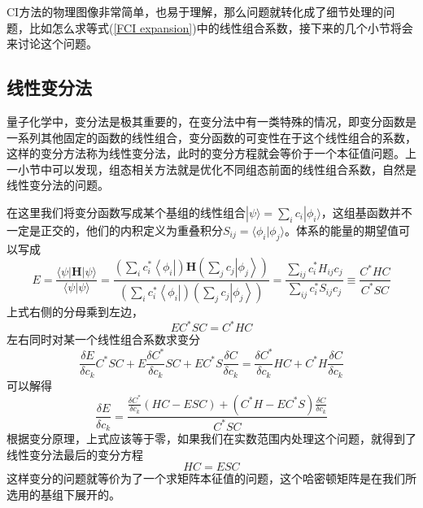 \documentclass[12pt,a4paper,openany,twoside]{book}
\numberwithin{equation}{section}
\begin{document}
          CI方法的物理图像非常简单，也易于理解，那么问题就转化成了细节处理的问题，比如怎么求等式(\ref{FCI expansion})中的线性组合系数，接下来的几个小节将会来讨论这个问题。
        \subsection{线性变分法}
          量子化学中，变分法是极其重要的，在变分法中有一类特殊的情况，即变分函数是一系列其他固定的函数的线性组合，变分函数的可变性在于这个线性组合的系数，这样的变分方法称为线性变分法，此时的变分方程就会等价于一个本征值问题。上一小节中可以发现，组态相关方法就是优化不同组态前面的线性组合系数，自然是线性变分法的问题。

          在这里我们将变分函数写成某个基组的线性组合$|\psi\rangle=\sum_{i} c_{i}|\phi_{i}\rangle$，这组基函数并不一定是正交的，他们的内积定义为重叠积分$S_{ij} = \langle \phi_i | \phi_j \rangle $。体系的能量的期望值可以写成
          \begin{equation}
            E=\frac{\langle\psi|\mathbf{H}| \psi\rangle}{\langle\psi | \psi\rangle}=\frac{(\sum_{i} c_{i}^{*}\left\langle\phi_{i}\right|) \mathbf{H}(\sum_{j} c_{j}\left|\phi_{j}\right\rangle)}{(\sum_{i} c_{i}^{*}\left\langle\phi_{i}\right|)(\sum_{j} c_{j}\left|\phi_{j}\right\rangle)}=\frac{\sum_{i j} c_{i}^{*} H_{i j} c_{j}}{\sum_{i j} c_{i}^{*} S_{i j} c_{j}} \equiv \frac{C^{*} H C}{C^{*} S C}
          \end{equation}
          上式右侧的分母乘到左边，
          \begin{equation}
            E C^{*} S C=C^{*} H C
          \end{equation}
          左右同时对某一个线性组合系数求变分
          \begin{equation}
            \frac{\delta E}{\delta c_{k}} C^{*} S C+E \frac{\delta C^{*}}{\delta c_{k}} S C+E C^{*} S \frac{\delta C}{\delta c_{k}}=\frac{\delta C^{*}}{\delta c_{k}} H C+C^{*} H \frac{\delta C}{\delta c_{k}}
          \end{equation}
          可以解得
          \begin{equation}
            \frac{\delta E}{\delta c_{k}}=\frac{\frac{\delta C^{*}}{\delta c_{k}}(H C-E S C)+\left(C^{*} H-E C^{*} S\right) \frac{\delta C}{\delta c_{k}}}{C^{*} S C}
          \end{equation}
          根据变分原理，上式应该等于零，如果我们在实数范围内处理这个问题，就得到了线性变分法最后的变分方程
          \begin{equation}
            HC = ESC
            \label{linear variation method}
          \end{equation}
          这样变分的问题就等价为了一个求矩阵本征值的问题，这个哈密顿矩阵是在我们所选用的基组下展开的。
          
\end{document}

